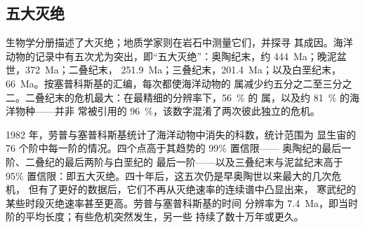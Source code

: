 \subsection*{五大灭绝}

生物学分册描述了大灭绝；地质学家则在岩石中测量它们，并探寻
其成因。海洋动物的记录中有五次尤为突出，即“五大灭绝”：奥陶纪末，约
\qty{444}{Ma}；晚泥盆世，\qty{372}{Ma}；二叠纪末，
\qty{251.9}{Ma}；三叠纪末，\qty{201.4}{Ma}；以及白垩纪末，
\qty{66}{Ma}。按塞普科斯基的汇编，每次都使海洋动物的
属减少约五分之二至三分之二。二叠纪末的危机最大：在最精细的分辨率下，\qty{56}{\percent} 的
属，以及约 \qty{81}{\percent} 的海洋物种——并非
常被引用的 \qty{96}{\percent}，该数字混淆了两次彼此独立的危机。

\begin{history}
1982 年，劳普与塞普科斯基统计了海洋动物中消失的科数，统计范围为
显生宙的 76 个阶中每一阶的情况。四个点高于其趋势的 99\% 置信限——
奥陶纪的最后一阶、二叠纪的最后两阶与白垩纪的
最后一阶——以及三叠纪末与泥盆纪末高于 95\%
置信限：即五大灭绝。四十年后，这五次仍是早奥陶世以来最大的几次危机，
但有了更好的数据后，它们不再从灭绝速率的连续谱中凸显出来，
寒武纪的某些时段灭绝速率甚至更高。劳普与塞普科斯基的时间
分辨率为 \qty{7.4}{Ma}，即当时阶的平均长度；有些危机突然发生，另一些
持续了数十万年或更久。
\end{history}

